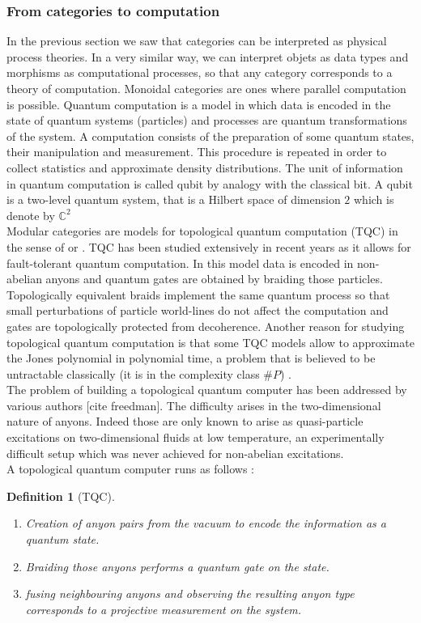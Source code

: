 \documentclass{article}
\newtheorem{definition}{Definition}
\begin{document}
\subsubsection{From categories to computation}
In the previous section we saw that categories can be interpreted as physical process theories. In a very similar way, we can interpret objets as data types and morphisms as computational processes, so that any category corresponds to a theory of computation. Monoidal categories are ones where parallel computation is possible. Quantum computation is a model in which data is encoded in the state of quantum systems (particles) and processes are quantum transformations of the system. A computation consists of the preparation of some quantum states, their manipulation and measurement. This procedure is repeated in order to collect statistics and approximate density distributions. The unit of information in quantum computation is called qubit by analogy with the classical bit. A qubit is a two-level quantum system, that is a Hilbert space of dimension $2$ which is denote by $\mathbb{C}^2$\\
Modular categories are models for topological quantum computation (TQC) in the sense of \cite{Kitaev03} or \cite{Rowell17}. TQC has been studied extensively in recent years as it allows for fault-tolerant quantum computation. In this model data is encoded in non-abelian anyons and quantum gates are obtained by braiding those particles. Topologically equivalent braids implement the same quantum process so that small perturbations of particle world-lines do not affect the computation and gates are topologically protected from decoherence.
Another reason for studying topological quantum computation is that some TQC models allow to approximate the Jones polynomial in polynomial time, a problem that is believed to be untractable classically (it is in the complexity class $\# P$) .\\
The problem of building a topological quantum computer has been addressed by various authors \cite{Kitaev03} [cite freedman]. The difficulty arises in the two-dimensional nature of anyons. Indeed those are only known to arise as quasi-particle excitations on two-dimensional fluids at low temperature, an experimentally difficult setup which was never achieved for non-abelian excitations.\\
A topological quantum computer runs as follows \cite{Rowell17}:
\begin{definition}[TQC]
	\begin{enumerate}
		\item Creation of anyon pairs from the vacuum to encode the information as a quantum state.
		\item Braiding those anyons performs a quantum gate on the state.
		\item fusing neighbouring anyons and observing the resulting anyon type corresponds to a projective measurement on the system.
	\end{enumerate}
\end{definition}
\end{document}
